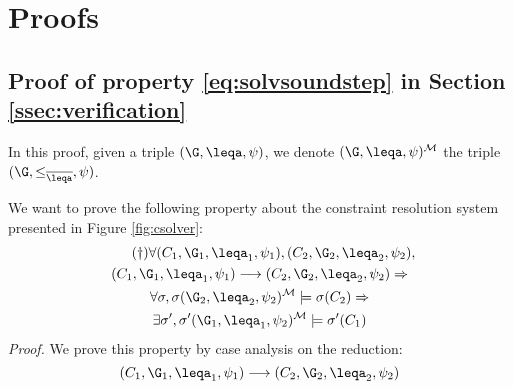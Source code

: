 \section{Proofs}
\newcommand{\sepa}{
\medskip
}
\subsection{Proof of property \ref{eq:solvsoundstep} in Section \ref{ssec:verification}}\label{app:proof}

\newcommand{\tomod}{^{\mathcal{M}}}
In this proof, given a triple $(\G,\leqa,\psi)$, we denote  $(\G,\leqa,\psi)^{\mathcal{M}}$ the triple 
$(\G,\leq_{\overline{\leqa}},\psi)$. 


We want to prove the following property about the constraint resolution system presented in Figure \ref{fig:csolver}:
\begin{multline}\tag{$\dagger$}
 \forall (C_1,\G_1,\leqa_1,\psi_1), (C_2,\G_2,\leqa_2,\psi_2),\\
     (C_1,\G_1,\leqa_1,\psi_1) \longrightarrow (C_2,\G_2,\leqa_2,\psi_2) \Rightarrow\\
     \forall \sigma, \sigma(\G_2,\leqa_2,\psi_2)\tomod \models \sigma(C_2) \Rightarrow\\
     \exists \sigma', \sigma'(\G_1,\leqa_1,\psi_2)\tomod \models \sigma'(C_1)
\end{multline}  
{\it Proof. }We prove this property by case analysis on the reduction:
$$(C_1,\G_1,\leqa_1,\psi_1) \longrightarrow (C_2,\G_2,\leqa_2,\psi_2)$$

